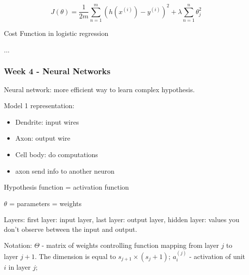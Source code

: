 \documentclass[12pt,a4paper]{report}
\begin{document}
\begin{equation}
J(\theta) = \frac{1}{2m} \sum_{n=1}^{m} (h(x^{(i)})-y^{(i)})^{2} + \lambda\sum_{n=1}^{n} \theta_{j}^{2}
\end{equation}

Cost Function in logistic regression

...
	
\subsubsection{Week 4 - Neural Networks}
	
	Neural network: more efficient way to learn complex hypothesis.
	
	Model 1 representation: 
	\begin{itemize}
	\item Dendrite: input wires
	\item Axon: output wire
	\item Cell body: do computations
	\item axon send info to another neuron
	\end{itemize}
	
	Hypothesis function = activation function
	
	$\theta$ = parameters = weights
	
	Layers: first layer: input layer, last layer: output layer, hidden layer: values you don't observe between the input and output.
	
	Notation: $\Theta$ - matrix of weights controlling function mapping from layer $j$ to layer $j+1$. The dimension is equal to $s_{j+1} \times (s_{j}+1)$; $a_{i}^{(j)}$ - activation of unit $i$ in layer $j$; 
	
\end{document}
